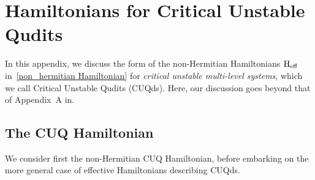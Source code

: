 \documentclass[12pt,a4paper]{article}
\begin{document}
\section{Hamiltonians for Critical Unstable Qudits}\label{App:CUQhamilton}

In this appendix, we discuss the form of the non-Hermitian Hamiltonians $\text{H}_{\rm eff}$
in~\eqref{non_hermitian Hamiltonian} for {\em critical unstable multi-level systems}, which we call Critical Unstable Qudits (CUQds). Here, our discussion goes beyond that of Appendix~A in\cite{Karamitros:2023tqr}.

\subsection{The CUQ Hamiltonian}

We consider first the non-Hermitian CUQ Hamiltonian, before embarking on the more general case of effective Hamiltonians describing CUQds.
\end{document}
